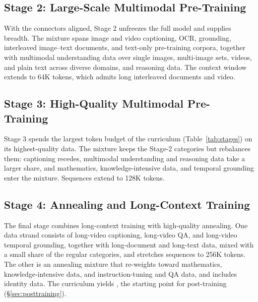 \subsection{Stage 2: Large-Scale Multimodal Pre-Training}\label{sec:pt-scale}

With the connectors aligned, Stage 2 unfreezes the full model and
supplies breadth. The mixture spans image and video captioning, OCR,
grounding, interleaved image--text documents, and text-only
pre-training corpora, together with multimodal understanding data over
single images, multi-image sets, videos, and plain text across diverse
domains, and reasoning data. The context window extends to 64K tokens,
which admits long interleaved documents and video.

\subsection{Stage 3: High-Quality Multimodal Pre-Training}\label{sec:pt-quality}

Stage 3 spends the largest token budget of the curriculum
(Table~\ref{tab:stages}) on its highest-quality data. The mixture keeps
the Stage-2 categories but rebalances them: captioning recedes,
multimodal understanding and reasoning data take a larger share, and
mathematics, knowledge-intensive data, and temporal grounding enter the
mixture. Sequences extend to 128K tokens.

\subsection{Stage 4: Annealing and Long-Context Training}\label{sec:pt-anneal}

The final stage combines long-context training with high-quality
annealing. One data strand consists of long-video captioning,
long-video QA, and long-video temporal grounding, together with
long-document and long-text data, mixed with a small share of the
regular categories, and stretches sequences to 256K tokens. The other is an annealing mixture that re-weights
toward mathematics, knowledge-intensive data, and instruction-tuning
and QA data, and includes identity data. The curriculum yields
\mossbase{}, the starting point for post-training
(\S\ref{sec:posttraining}).
